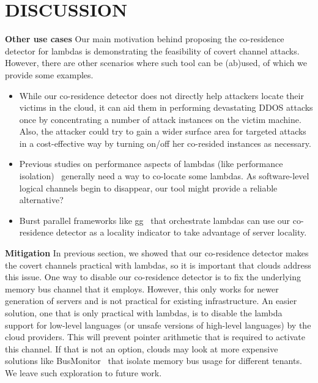 \section{DISCUSSION}
\label{sec:discussion}
\textbf{Other use cases}
Our main motivation behind proposing the co-residence detector for lambdas is 
demonstrating the feasibility of covert channel attacks. However, there are 
other scenarios where such tool can be (ab)used, of which we provide some 
examples. 
\begin{itemize}
    \item While our co-residence detector does not directly help attackers 
    locate their victims in the cloud, it can aid them in performing devastating 
    DDOS attacks once by concentrating a number of attack instances on the victim 
    machine. Also, the attacker could try to gain a wider surface area for 
    targeted attacks in a cost-effective way by turning on/off her co-resided 
    instances as necessary. 
    \item Previous studies on performance aspects of lambdas (like performance 
    isolation)~\cite{wangusenix2018} generally need a way to co-locate some 
    lambdas. As software-level logical channels begin to disappear, our tool 
    might provide a reliable alternative?
    \item Burst parallel frameworks like gg~\cite{234886} that orchestrate lambdas 
    can use our co-residence detector as a locality indicator to take advantage 
    of server locality.
\end{itemize}

\textbf{Mitigation}
In previous section, we showed that our co-residence detector makes the covert channels
practical with lambdas, so it is important that clouds address this issue. One way to 
disable our co-residence detector is to fix the underlying memory bus channel that it 
employs. However, this only works for newer generation of servers and is not practical 
for existing infrastructure. An easier solution, one that is only practical with lambdas,
is to disable the lambda support for low-level languages (or unsafe versions of high-level 
languages) by the cloud providers. This will prevent pointer arithmetic that is required 
to activate this channel. If that is not an option, clouds may look at more expensive 
solutions like BusMonitor~\cite{MemoryBusMitigation} that isolate memory bus usage for 
different tenants. We leave such exploration to future work.